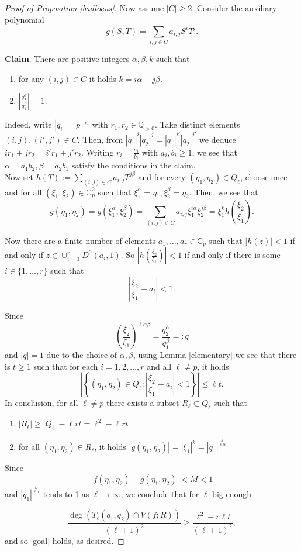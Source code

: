 \documentclass[a4paper,11pt]{amsart}
\newcommand{\ce}{\mathbb{C}}
\newcommand{\q}{\mathbb{Q}}
\theoremstyle{definition}
\begin{document}
\begin{proof}[Proof of Proposition \ref{badlocus}]
Now assume $|C|\geq 2$. Consider the auxiliary polynomial $$g(S,T)=\sum_{i,j \in C}a_{i,j}S^iT^j.$$ 

{\bf Claim}. There are positive integers $\alpha, \beta, k$ such that
\begin{enumerate}
\item[i)] for any $(i,j)\in C$ it holds $k=i\alpha + j\beta$.
\item[ii)] $\left|\frac{q_2^\alpha}{q_1^\beta}\right|=1$.
\end{enumerate}

Indeed, write $|q_i|=p^{-r_i}$ with $r_1,r_2\in \q_{>0}$. Take distinct elements $(i,j),(i',j')\in C$. Then, from $|q_1|^i|q_2|^j=|q_1|^{i'}|q_2|^{j'}$ we deduce $ir_1+jr_2=i'r_1+j'r_2$. Writing $r_i=\frac{a_i}{b_i}$ with $a_i,b_i\geq 1$, we see that  $\alpha=a_1b_2, \beta=a_2b_1$ satisfy the conditions in the claim.\\



 Now set $h(T):=\sum_{(i,j)\in C} a_{i,j}T^{j\beta}$ and for every $(\eta_1,\eta_2)\in Q_\ell$, choose once and for all $(\xi_1,\xi_2)\in \ce_p^2$ such that $\xi_1^{\alpha}=\eta_{1}, \xi_2^\beta=\eta_{2}$. Then, we see that 
 $$g(\eta_1,\eta_2)=g(\xi_1^\alpha,\xi_2^\beta)=\sum_{(i,j)\in C}a_{i,j}\xi_1^{i\alpha}\xi_2^{j\beta}=\xi_1^kh\left(\frac{\xi_2}{\xi_1}\right).$$


Now there are a finite number of elements $a_1,\ldots, a_r\in \ce_p$ such that $|h(z)|<1$ if and only if $z\in \cup_{i=1}^rD^0(a_i,1).$ So $\left |h\left(\frac{ \xi_2}{\xi_1}\right)\right|<1$ if and only if there is some $i\in \{1,\ldots,r\}$ such that $$\left|\frac{ \xi_2}{\xi_1}-a_i\right|<1.$$

Since $$\left(\frac{\xi_2}{\xi_1}\right)^{\ell \alpha \beta}=\frac{q_2^{\alpha}}{q_1^\beta}=:q$$ and $|q|=1$ due to the choice of $\alpha, \beta$, using Lemma \ref{elementary} we see that there is $t\geq 1$ such that  for each $i=1,2,\ldots,r$ and all $\ell \neq p$, it holds
$$\left|\left\{(\eta_1,\eta_2)\in Q_\ell : \left|\frac{ \xi_2}{\xi_1}-a_i\right|<1\right\}\right|\leq \ell t.$$
In conclusion, for all $\ell\neq p$ there exists a subset $R_\ell \subset Q_\ell$ such that 
\begin{enumerate}
\item[i)] $|R_\ell|\geq |Q_\ell|-\ell rt=\ell^2-\ell rt$
\item[ii)] for all $(\eta_1,\eta_2)\in R_\ell$, it holds $|g(\eta_1,\eta_2)|=|\xi_1|^k=|q_1|^{\frac{k}{\ell \alpha}}$
\end{enumerate}

Since $$|f(\eta_1,\eta_2)-g(\eta_1,\eta_2)|<M<1$$ and   $|q_1|^{\frac{k}{\ell \alpha}}$ tends to 1 as $\ell \rightarrow \infty$, we conclude that for $\ell$ big enough

$$\frac{\deg (T_\ell(q_1,q_2)\cap V(f;R))}{(\ell+1)^2}\geq \frac{\ell^2-r\ell t}{(\ell+1)^2},$$
and so \eqref{goal} holds, as desired.
\end{proof}
\end{document}
